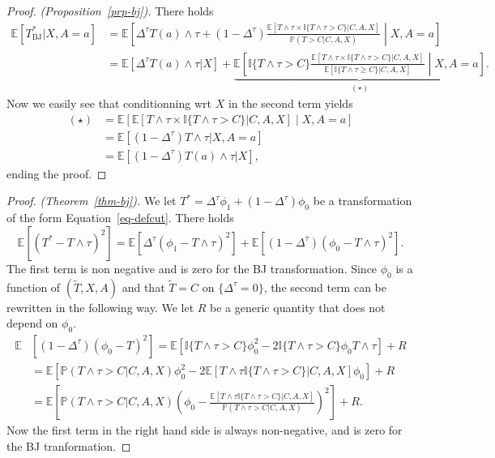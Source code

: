\documentclass[
  11pt,
  a4paper,
]{article}
\theoremstyle{plain}
\theoremstyle{plain}
\theoremstyle{plain}
\theoremstyle{definition}
\theoremstyle{remark}
\begin{document}
\begin{proof}
\emph{(Proposition~\ref{prp-bj}).} There holds \[
\begin{aligned}
\mathbb{E}[T_{\mathrm{BJ}}^*|X,A=a] &= \mathbb{E}\left[\Delta^\tau T(a) \wedge \tau + (1-\Delta^\tau)\frac{\mathbb{E}[T \wedge \tau \times \mathbb{I}\{T \wedge \tau > C\}|C,A,X]}{\mathbb{P}(T > C|C,A,X)} \middle | X,A=a \right] \\
&= \mathbb{E}[\Delta^\tau T(a) \wedge \tau | X ] +  \underbrace{\mathbb{E}\left[ \mathbb{I}\{T \wedge \tau > C\} \frac{\mathbb{E}[T \wedge \tau \times \mathbb{I}\{T \wedge \tau > C\}|C,A,X]}{\mathbb{E}[\mathbb{I}\{T \wedge \tau \geqslant C\}|C,A,X]}\middle | X,A=a \right]}_{(\star)}.
\end{aligned}
\] Now we easily see that conditionning wrt \(X\) in the second term
yields \begin{align*}
(\star) &= \mathbb{E}\left[ \mathbb{E}[T \wedge \tau \times \mathbb{I}\{T \wedge \tau > C\}|C,A,X] \middle | X,A=a \right] \\
&= \mathbb{E}[(1-\Delta^\tau) T \wedge \tau | X,A=a ]  \\
&= \mathbb{E}[(1-\Delta^\tau)  T(a) \wedge \tau | X], 
\end{align*} ending the proof.
\end{proof}

\begin{proof}
\emph{(Theorem~\ref{thm-bj}).} We let
\(T^* = \Delta^\tau \phi_1 + (1-\Delta^\tau)\phi_0\) be a transformation
of the form Equation~\ref{eq-defcut}. There holds \[
\mathbb{E}[(T^*-T \wedge \tau)^2] = \mathbb{E}[\Delta^\tau (\phi_1-T \wedge \tau)^2] + \mathbb{E}[(1-\Delta^\tau)(\phi_0-T \wedge \tau)^2].
\] The first term is non negative and is zero for the BJ transformation.
Since \(\phi_0\) is a function of \((\widetilde T, X, A)\) and that
\(\widetilde T = C\) on \(\{\Delta^\tau = 0\}\), the second term can be
rewritten in the following way. We let \(R\) be a generic quantity that
does not depend on \(\phi_0\). \begin{align*}
\mathbb{E}&[(1-\Delta^\tau)(\phi_0-T)^2] = \mathbb{E}\left[\mathbb{I}\{T\wedge \tau > C\} \phi_0^2 - 2 \mathbb{I}\{T\wedge \tau > C\} \phi_0 T \wedge \tau\right]  + R \\
&= \mathbb{E}\left[ \mathbb{P}(T\wedge \tau > C|C,A,X) \phi_0^2 - 2 \mathbb{E}[T\wedge \tau \mathbb{I}\{T\wedge \tau > C\}|C,A,X] \phi_0 \right] + R \\
&= \mathbb{E}\left[\mathbb{P}(T\wedge \tau > C|C,A,X) \left(\phi_0- \frac{\mathbb{E}[T\wedge \tau \mathbb{I}\{T\wedge \tau > C\}|C,A,X]}{\mathbb{P}(T\wedge \tau > C|C,A,X) }\right)^2\right] + R.
\end{align*} Now the first term in the right hand side is always
non-negative, and is zero for the BJ tranformation.
\end{proof}
\end{document}
